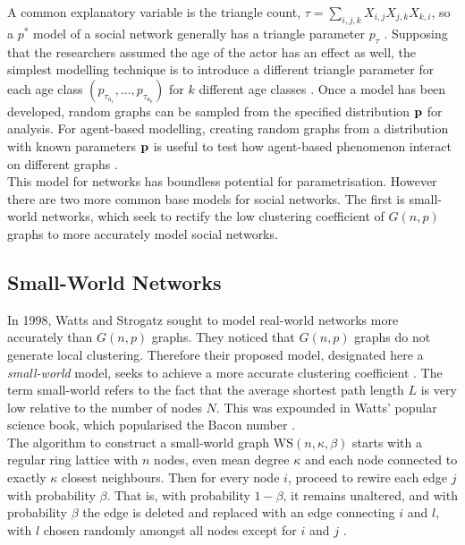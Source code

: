 A common explanatory variable is the triangle count, $\tau = \sum_{i,j,k} X_{i,j}X_{j,k}X_{k,i}$, so a $p^*$ model of a social network generally has a triangle parameter $p_\tau$ \cite{RN84}. Supposing that the researchers assumed the age of the actor has an effect as well, the simplest modelling technique is to introduce a different triangle parameter for each age class $(p_{\tau_{a_1}}, \dots, p_{\tau_{a_k}})$ for $k$ different age classes \cite{RN64}. Once a model has been developed, random graphs can be sampled from the specified distribution $\mathbf{p}$ for analysis. For agent-based modelling, creating random graphs from a distribution with known parameters $\mathbf{p}$ is useful to test how agent-based phenomenon interact on different graphs \cite{RN86}. \\

This model for networks has boundless potential for parametrisation. However there are two more common base models for social networks. The first is small-world networks, which seek to rectify the low clustering coefficient of $G(n,p)$ graphs to more accurately model social networks. \\
 
 

 \subsection{Small-World Networks}
In 1998, Watts and Strogatz sought to model real-world networks more accurately than $G(n,p)$ graphs. They noticed that $G(n,p)$ graphs do not generate local clustering. Therefore their proposed model, designated here a \emph{small-world} model, seeks to achieve a more accurate clustering coefficient \cite{RN58}. The term small-world refers to the fact that the average shortest path length $L$ is very low relative to the number of nodes $N$. This was expounded in Watts' popular science book,  which popularised the Bacon number \cite{RN57}.   \\

The algorithm to construct a small-world graph $\mathrm{WS}(n,\kappa,\beta)$ starts with a regular ring lattice with $n$ nodes, even mean degree $\kappa$ and each node connected to exactly $\kappa$ closest neighbours. Then for every node $i$, proceed to rewire each edge $j$ with probability $\beta$. That is, with probability $1-\beta$, it remains unaltered, and with probability $\beta$ the edge is deleted and replaced with an edge connecting $i$ and $l$, with $l$ chosen randomly amongst all nodes except for $i$ and $j$ \cite{RN58}. \\

